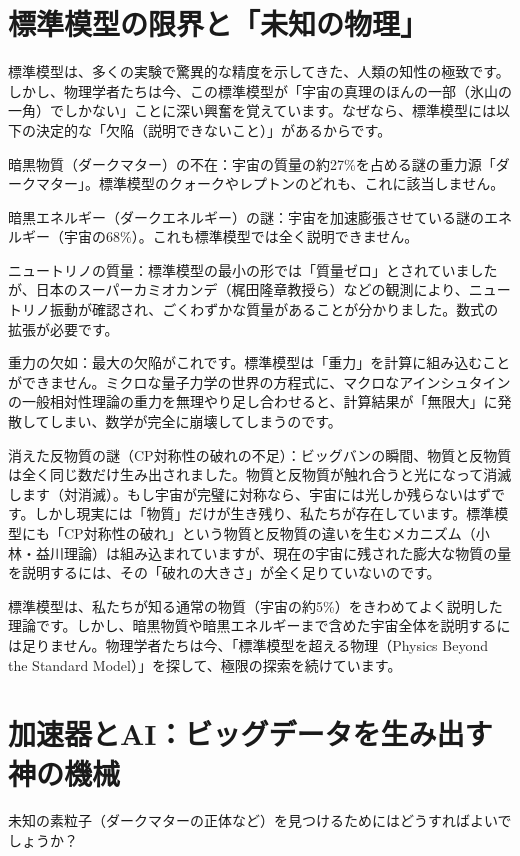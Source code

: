 \section{標準模型の限界と「未知の物理」}

標準模型は、多くの実験で驚異的な精度を示してきた、人類の知性の極致です。しかし、物理学者たちは今、この標準模型が「宇宙の真理のほんの一部（氷山の一角）でしかない」ことに深い興奮を覚えています。なぜなら、標準模型には以下の決定的な「欠陥（説明できないこと）」があるからです。

暗黒物質（ダークマター）の不在：宇宙の質量の約27\%を占める謎の重力源「ダークマター」。標準模型のクォークやレプトンのどれも、これに該当しません。

暗黒エネルギー（ダークエネルギー）の謎：宇宙を加速膨張させている謎のエネルギー（宇宙の68\%）。これも標準模型では全く説明できません。

ニュートリノの質量：標準模型の最小の形では「質量ゼロ」とされていましたが、日本のスーパーカミオカンデ（梶田隆章教授ら）などの観測により、ニュートリノ振動が確認され、ごくわずかな質量があることが分かりました。数式の拡張が必要です。

重力の欠如：最大の欠陥がこれです。標準模型は「重力」を計算に組み込むことができません。ミクロな量子力学の世界の方程式に、マクロなアインシュタインの一般相対性理論の重力を無理やり足し合わせると、計算結果が「無限大」に発散してしまい、数学が完全に崩壊してしまうのです。

消えた反物質の謎（CP対称性の破れの不足）：ビッグバンの瞬間、物質と反物質は全く同じ数だけ生み出されました。物質と反物質が触れ合うと光になって消滅します（対消滅）。もし宇宙が完璧に対称なら、宇宙には光しか残らないはずです。しかし現実には「物質」だけが生き残り、私たちが存在しています。標準模型にも「CP対称性の破れ」という物質と反物質の違いを生むメカニズム（小林・益川理論）は組み込まれていますが、現在の宇宙に残された膨大な物質の量を説明するには、その「破れの大きさ」が全く足りていないのです。

標準模型は、私たちが知る通常の物質（宇宙の約5\%）をきわめてよく説明した理論です。しかし、暗黒物質や暗黒エネルギーまで含めた宇宙全体を説明するには足りません。物理学者たちは今、「標準模型を超える物理（Physics Beyond the Standard Model）」を探して、極限の探索を続けています。

\section{加速器とAI：ビッグデータを生み出す神の機械}

未知の素粒子（ダークマターの正体など）を見つけるためにはどうすればよいでしょうか？

